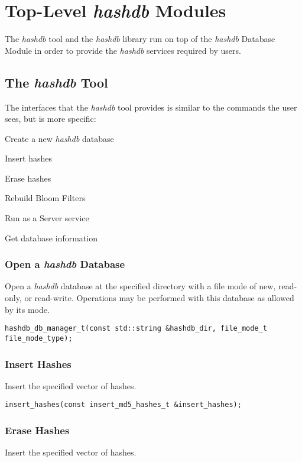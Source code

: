 \documentclass[12pt,twoside]{article}
\newcommand{\hdb}{\emph{hashdb}\xspace}
\begin{document}
\section{Top-Level \hdb Modules}
The \hdb tool and the \hdb library run on top of the \hdb Database Module
in order to provide the \hdb services required by users.

\subsection{The \hdb Tool}
The interfaces that the \hdb tool provides is similar to the commands
the user sees, but is more specific:
\begin{compactitem}
\item Create a new \hdb database
\item Insert hashes
\item Erase hashes
\item Rebuild Bloom Filters
\item Run as a Server service
\item Get database information
\end{compactitem}

\subsubsection{Open a \hdb Database}
Open a \hdb database at the specified directory
with a file mode of new, read-only, or read-write.
Operations may be performed with this database as allowed by its mode.

\begin{small}
\begin{verbatim}
hashdb_db_manager_t(const std::string &hashdb_dir, file_mode_t file_mode_type);
\end{verbatim}
\end{small}

\subsubsection{Insert Hashes}
Insert the specified vector of hashes.

\begin{small}
\begin{verbatim}
insert_hashes(const insert_md5_hashes_t &insert_hashes);
\end{verbatim}
\end{small}

\subsubsection{Erase Hashes}
Insert the specified vector of hashes.
\end{document}
